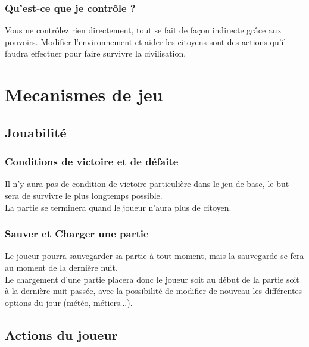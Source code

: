\documentclass[a4paper]{article}
\newcommand{\alinea}{\hspace*{0.5cm}}
\begin{document}
        \subsubsection{Qu'est-ce que je contrôle ?}
          \alinea Vous ne contrôlez rien directement, tout se fait de façon indirecte grâce aux pouvoirs. Modifier l'environnement et aider les citoyens sont des actions qu'il faudra effectuer pour faire survivre la civilisation.
    
    \section{Mecanismes de jeu}
      \subsection{Jouabilité}
        \subsubsection{Conditions de victoire et de défaite}
          \alinea Il n'y aura pas de condition de victoire particulière dans le jeu de base, le but sera de survivre le plus longtemps possible.\\
          La partie se terminera quand le joueur n'aura plus de citoyen.
        \subsubsection{Sauver et Charger une partie}
          \alinea Le joueur pourra sauvegarder sa partie à tout moment, mais la sauvegarde se fera au moment de la dernière nuit.\\
          Le chargement d'une partie placera donc le joueur soit au début de la partie soit à la dernière nuit passée, avec la possibilité de modifier de nouveau les différentes options du jour (météo, métiers...).


	  \subsection{Actions du joueur}
\end{document}
